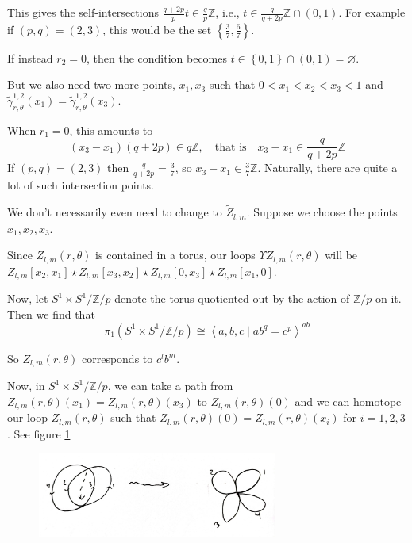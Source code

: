 \documentclass[reqno]{amsart}
\theoremstyle{definition}
\theoremstyle{remark}
\begin{document}
This gives the self-intersections
$\frac{q+2p}{p}t \in \frac{q}{p}\mathbb{Z}$, i.e.,
$t \in \frac{q}{q+2p}\mathbb{Z} \cap (0,1)$.
For example if $(p,q) = (2,3)$, this would be the set
$\left\{ \frac{3}{7}, \frac{6}{7} \right\} $.

If instead $r_2 = 0$, then
the condition becomes $t \in \left\{ 0,1 \right\} \cap
\left( 0,1 \right) = \varnothing$.




But we also need two more points,
$x_1,x_3$ such that
$0 < x_1 < x_2 < x_3 < 1$ and
$\tilde{\gamma}_{r, \theta}^{1,2}(x_1) = 
\tilde{\gamma}_{r, \theta}^{1,2}(x_3)$.

When $r_1 = 0$, this amounts to
\[
    (x_3-x_1) (q+2p) \in q \mathbb{Z}, \quad \text{that is} \quad
    x_3 - x_1 \in \frac{q}{q+2p}\mathbb{Z}
\] 
If $(p,q) = (2,3)$ then
$\frac{q}{q+2p} = \frac{3}{7}$, so
$x_3 - x_1 \in \frac{3}{7}\mathbb{Z}$.
Naturally, there are quite a lot of such intersection points.



We don't necessarily even need to change to
$\tilde{Z}_{l,m}$. Suppose
we choose the points
$x_1, x_2,x_3$.

Since $Z_{l,m}(r , \theta)$ is contained in
a torus, our loops
$\Upsilon Z_{l,m}(r, \theta)$ will
be
$Z_{l,m}[x_2,x_1] \star Z_{l,m}[x_3, x_2] \star
Z_{l,m}[0, x_3] \star Z_{l,m}[x_1, 0]$.

Now, let $S^{1} \times S^{1} / \mathbb{Z}/p$ denote the torus quotiented
out by the action of $\mathbb{Z}/p$ on it.
Then we find that
\[
\pi_1 \left( S^{1} \times S^{1} / \mathbb{Z}/p \right) \cong
\left<a,b,c  \mid ab^{q} = c^{p} \right>^{ab}
\] 

So $Z_{l,m}(r, \theta)$ corresponds to
$c^{l} b^{m}$.

Now, in
$S^{1} \times S^{1} / \mathbb{Z}/p$, we can
take a path from $Z_{l,m}\left( r,\theta \right) (x_1) = 
Z_{l,m}\left( r, \theta \right) (x_3)$ to
$Z_{l,m}(r, \theta) (0)$ and we can homotope our
loop $Z_{l,m}\left( r ,\theta \right) $ such that
$Z_{l,m}\left( r, \theta \right) (0) = 
Z_{l,m}(r, \theta)(x_i)$ for $i = 1,2,3$.
See figure \ref{fig:Figures-NGIWKZN-jpeg}


\begin{figure}[htpb]
    \centering
    \includegraphics[width=0.7\textwidth]{Figures/NGIWKZN.jpeg}
    \caption{}
    \label{fig:Figures-NGIWKZN-jpeg}
\end{figure}
\end{document}
